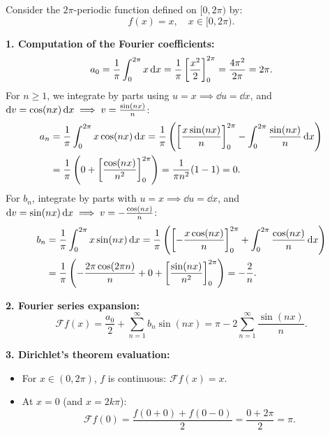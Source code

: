 \begin{exemple}
Consider the $2\pi$-periodic function defined on $[0, 2\pi)$ by:
\[
f(x) = x, \quad x \in [0, 2\pi).
\]

\textbf{1. Computation of the Fourier coefficients:}
\[
a_0 = \frac{1}{\pi} \int_0^{2\pi} x \,\mathrm{d}x = \frac{1}{\pi} \left[ \frac{x^2}{2} \right]_0^{2\pi} = \frac{4\pi^2}{2\pi} = 2\pi.
\]
For $n \ge 1$, we integrate by parts using $u = x \implies \dd u = \dd x$, and $\mathrm{d} v = \cos(nx)\,\mathrm{d}x \implies v = \frac{\sin(nx)}{n}$:
\begin{align*}
a_n &= \frac{1}{\pi} \int_0^{2\pi} x \cos(nx) \,\mathrm{d}x = \frac{1}{\pi} \left( \left[ \frac{x \sin(nx)}{n} \right]_0^{2\pi} - \int_0^{2\pi} \frac{\sin(nx)}{n} \,\mathrm{d}x \right) \\
    &= \frac{1}{\pi} \left( 0 + \left[ \frac{\cos(nx)}{n^2} \right]_0^{2\pi} \right) = \frac{1}{\pi n^2} (1 - 1) = 0.
\end{align*}
For $b_n$, integrate by parts with $u = x \implies \dd u = \dd x$, and $\mathrm{d} v = \sin(nx)\,\mathrm{d}x \implies v = -\frac{\cos(nx)}{n}$:
\begin{align*}
b_n &= \frac{1}{\pi} \int_0^{2\pi} x \sin(nx) \,\mathrm{d}x = \frac{1}{\pi} \left( \left[ -\frac{x \cos(nx)}{n} \right]_0^{2\pi} + \int_0^{2\pi} \frac{\cos(nx)}{n} \,\mathrm{d}x \right) \\
    &= \frac{1}{\pi} \left( -\frac{2\pi \cos(2\pi n)}{n} + 0 + \left[ \frac{\sin(nx)}{n^2} \right]_0^{2\pi} \right) = -\frac{2}{n}.
\end{align*}

\textbf{2. Fourier series expansion:}
\[
\mathcal{F}f(x) = \frac{a_0}{2} + \sum_{n=1}^\infty b_n \sin(nx) = \pi - 2 \sum_{n=1}^\infty \frac{\sin(nx)}{n}.
\]

\textbf{3. Dirichlet's theorem evaluation:}
\begin{itemize}
    \item For $x \in (0, 2\pi)$, $f$ is continuous: $\mathcal{F}f(x) = x$.
    \item At $x = 0$ (and $x = 2k\pi$):
    \[
    \mathcal{F}f(0) = \frac{f(0+0) + f(0-0)}{2} = \frac{0 + 2\pi}{2} = \pi.
    \]
\end{itemize}
\end{exemple}